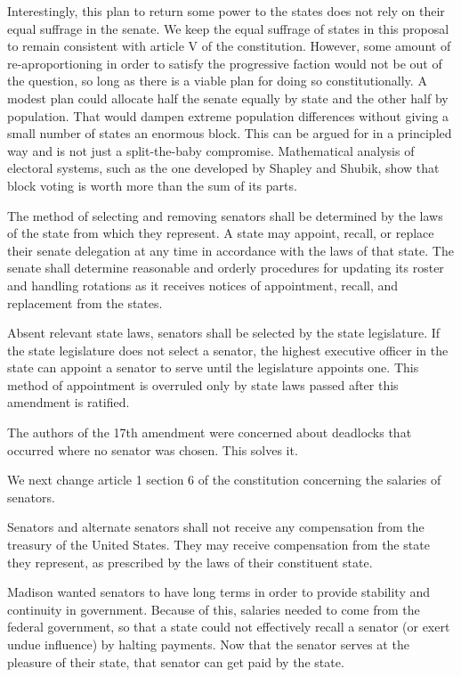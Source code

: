 \documentclass{article}
\begin{document}
Interestingly, this plan to return some power to the states does not rely on their equal suffrage in the senate. We keep the equal suffrage of states in this proposal to remain consistent with article V of the constitution. However, some amount of re-aproportioning in order to satisfy the progressive faction would not be out of the question, so long as there is a viable plan for doing so constitutionally\cite{Amar}. A modest plan could allocate half the senate equally by state and the other half by population. That would dampen extreme population differences without giving a small number of states an enormous block. This can be argued for in a principled way and is not just a split-the-baby compromise. Mathematical analysis of electoral systems, such as the one developed by Shapley and Shubik\cite{Shapley}, show that block voting is worth more than the sum of its parts.

\begin{quoting}
The method of selecting and removing senators shall be determined by the laws of the state from which they represent. A state may appoint, recall, or replace their senate delegation at any time in accordance with the laws of that state. The senate shall determine reasonable and orderly procedures for updating its roster and handling rotations as it receives notices of appointment, recall, and replacement from the states.

Absent relevant state laws, senators shall be selected by the state legislature. If the state legislature does not select a senator, the highest executive officer in the state can appoint a senator to serve until the legislature appoints one. This method of appointment is overruled only by state laws passed after this amendment is ratified.
\end{quoting}

The authors of the 17th amendment were concerned about deadlocks that occurred where no senator was chosen. This solves it.

We next change article 1 section 6 of the constitution concerning the salaries of senators.

\begin{quoting}
Senators and alternate senators shall not receive any compensation from the treasury of the United States. They may receive compensation from the state they represent, as prescribed by the laws of their constituent state.
\end{quoting}

Madison wanted senators to have long terms in order to provide stability and continuity in government.\cite{senate} Because of this, salaries needed to come from the federal government, so that a state could not effectively recall a senator (or exert undue influence) by halting payments. Now that the senator serves at the pleasure of their state, that senator can get paid by the state.
\end{document}
